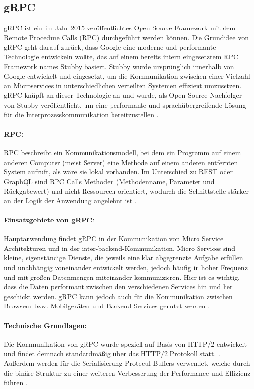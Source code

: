 \clearpage
\subsection{gRPC}
gRPC ist ein im Jahr 2015 veröffentlichtes Open Source Framework mit dem Remote Procedure Calls (RPC) durchgeführt werden können. Die Grundidee von gRPC geht darauf zurück, dass Google eine moderne und performante Technologie entwickeln wollte, das auf einem bereits intern eingesetztem RPC Framework names Stubby basiert. 
Stubby wurde ursprünglich innerhalb von Google entwickelt und eingesetzt, um die Kommunikation zwischen einer Vielzahl an Microservices in unterschiedlichen verteilten Systemen effizient umzusetzen. gRPC knüpft an dieser Technologie an und wurde, als Open Source Nachfolger von Stubby veröffentlicht, um eine performante und sprachübergreifende Lösung für die Interprozesskommunikation bereitzustellen \parencite{grpc-history}.


\paragraph{RPC:}
RPC beschreibt ein Kommunikationsmodell, bei dem ein Programm auf einem anderen Computer (meist Server) eine Methode auf einem anderen entfernten System aufruft, als wäre sie lokal vorhanden. Im Unterschied zu REST oder GraphQL sind RPC Calls Methoden (Methodenname, Parameter und Rückgabewert) und nicht Ressourcen orientiert, wodurch die Schnittstelle stärker an der Logik der Anwendung angelehnt ist \parencite{aws-rpc-vs-rest}.

\paragraph{Einsatzgebiete von gRPC:} Hauptanwendung findet gRPC in der Kommunikation von Micro Service Architekturen und in der inter-backend-Kommunikation. Micro Services sind kleine, eigenständige Dienste, die jeweils eine klar abgegrenzte Aufgabe erfüllen und unabhängig voneinander entwickelt werden, jedoch häufig in hoher Frequenz und mit großen Datenmengen miteinander kommunizieren. Hier ist es wichtig, dass die Daten performant zwischen den verschiedenen Services hin und her geschickt werden. gRPC kann jedoch auch für die Kommunikation zwischen Browsern bzw. Mobilgeräten und Backend Services genutzt werden \parencite{grpc-about}.

\paragraph{Technische Grundlagen:} Die Kommunikation von gRPC wurde speziell auf Basis von HTTP/2 entwickelt und findet demnach standardmäßig über das HTTP/2 Protokoll statt. \parencite{grpc-googleblog}. Außerdem werden für die Serialisierung Protocul Buffers verwendet, welche durch die binäre Struktur zu einer weiteren Verbesserung der Performance und Effizienz führen \parencite{protobufdocs}.

